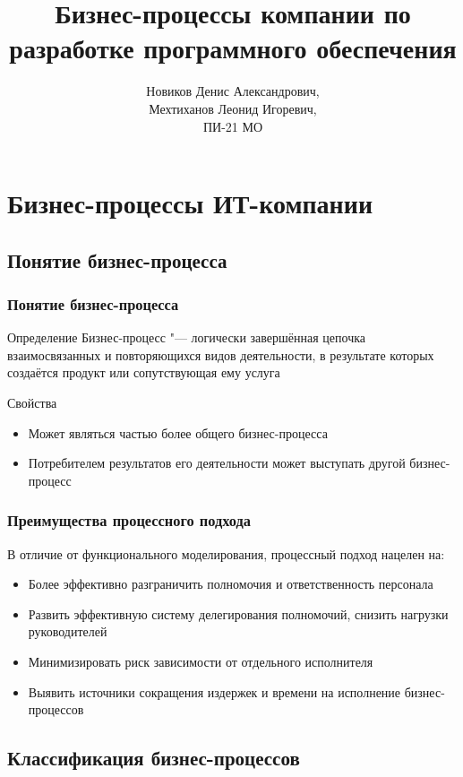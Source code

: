 \documentclass{../industrial-development}
\title{Бизнес-процессы компании по разработке программного обеспечения}
\author{Новиков Денис Александрович, \\Мехтиханов Леонид Игоревич, \\ПИ-21 МО}
\date{}
\begin{document}
\begin{frame}
  \titlepage
\end{frame}


\section{Бизнес-процессы ИТ-компании}

\subsection{Понятие бизнес-процесса}


\begin{frame} \frametitle{Понятие бизнес-процесса}
	\begin{block}{Определение}
		\alert{Бизнес-процесс} "--- логически завершённая цепочка взаимосвязанных и повторяющихся видов деятельности, в результате которых создаётся продукт или сопутствующая ему услуга
	\end{block}
	\begin{block}{Свойства}
		\begin{itemize}
			\item Может являться частью более общего бизнес-процесса
			\item Потребителем результатов его деятельности может выступать другой бизнес-процесс
		\end{itemize}
	\end{block}
\end{frame}
\lecturenotes


\begin{frame} \frametitle{Преимущества процессного подхода}
	В отличие от функционального моделирования, процессный подход нацелен на:
	\begin{itemize}
		\item Более эффективно разграничить полномочия и ответственность персонала
		\item Развить эффективную систему делегирования полномочий, снизить нагрузки руководителей
		\item Минимизировать риск зависимости от отдельного исполнителя
		\item Выявить источники сокращения издержек и времени на исполнение бизнес-процессов
	\end{itemize}
\end{frame}
\lecturenotes


\subsection{Классификация бизнес-процессов}
\end{document}
